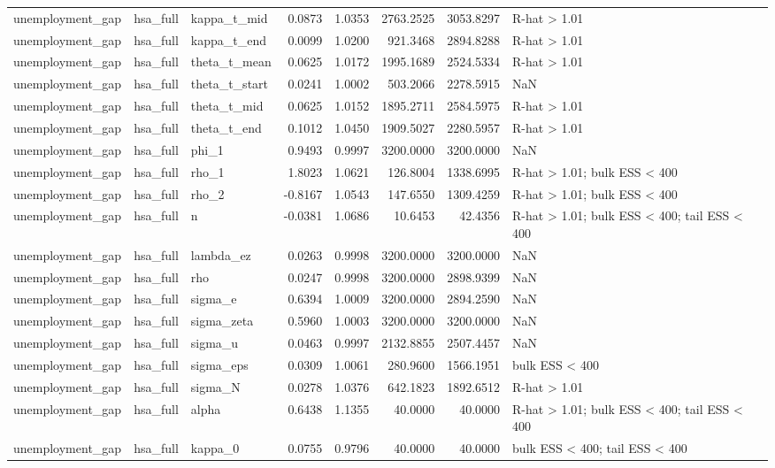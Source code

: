 \begin{tabular}{lllrrrrl}
unemployment\_gap & hsa\_full & kappa\_t\_mid & 0.0873 & 1.0353 & 2763.2525 & 3053.8297 & R-hat > 1.01 \\
unemployment\_gap & hsa\_full & kappa\_t\_end & 0.0099 & 1.0200 & 921.3468 & 2894.8288 & R-hat > 1.01 \\
unemployment\_gap & hsa\_full & theta\_t\_mean & 0.0625 & 1.0172 & 1995.1689 & 2524.5334 & R-hat > 1.01 \\
unemployment\_gap & hsa\_full & theta\_t\_start & 0.0241 & 1.0002 & 503.2066 & 2278.5915 & NaN \\
unemployment\_gap & hsa\_full & theta\_t\_mid & 0.0625 & 1.0152 & 1895.2711 & 2584.5975 & R-hat > 1.01 \\
unemployment\_gap & hsa\_full & theta\_t\_end & 0.1012 & 1.0450 & 1909.5027 & 2280.5957 & R-hat > 1.01 \\
unemployment\_gap & hsa\_full & phi\_1 & 0.9493 & 0.9997 & 3200.0000 & 3200.0000 & NaN \\
unemployment\_gap & hsa\_full & rho\_1 & 1.8023 & 1.0621 & 126.8004 & 1338.6995 & R-hat > 1.01; bulk ESS < 400 \\
unemployment\_gap & hsa\_full & rho\_2 & -0.8167 & 1.0543 & 147.6550 & 1309.4259 & R-hat > 1.01; bulk ESS < 400 \\
unemployment\_gap & hsa\_full & n & -0.0381 & 1.0686 & 10.6453 & 42.4356 & R-hat > 1.01; bulk ESS < 400; tail ESS < 400 \\
unemployment\_gap & hsa\_full & lambda\_ez & 0.0263 & 0.9998 & 3200.0000 & 3200.0000 & NaN \\
unemployment\_gap & hsa\_full & rho & 0.0247 & 0.9998 & 3200.0000 & 2898.9399 & NaN \\
unemployment\_gap & hsa\_full & sigma\_e & 0.6394 & 1.0009 & 3200.0000 & 2894.2590 & NaN \\
unemployment\_gap & hsa\_full & sigma\_zeta & 0.5960 & 1.0003 & 3200.0000 & 3200.0000 & NaN \\
unemployment\_gap & hsa\_full & sigma\_u & 0.0463 & 0.9997 & 2132.8855 & 2507.4457 & NaN \\
unemployment\_gap & hsa\_full & sigma\_eps & 0.0309 & 1.0061 & 280.9600 & 1566.1951 & bulk ESS < 400 \\
unemployment\_gap & hsa\_full & sigma\_N & 0.0278 & 1.0376 & 642.1823 & 1892.6512 & R-hat > 1.01 \\
unemployment\_gap & hsa\_full & alpha & 0.6438 & 1.1355 & 40.0000 & 40.0000 & R-hat > 1.01; bulk ESS < 400; tail ESS < 400 \\
unemployment\_gap & hsa\_full & kappa\_0 & 0.0755 & 0.9796 & 40.0000 & 40.0000 & bulk ESS < 400; tail ESS < 400 \\

\end{tabular}
